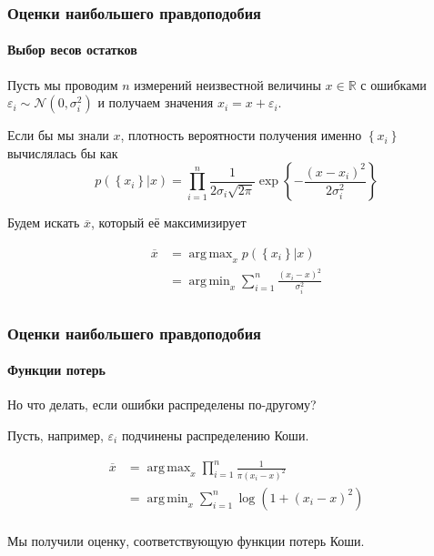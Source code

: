 \documentclass[notheorems,aspectratio=169]{beamer}
\DeclareMathOperator*{\argmax}{arg\,max}
\DeclareMathOperator*{\argmin}{arg\,min}
\begin{document}
\begin{frame}
  \frametitle{Оценки наибольшего правдоподобия}
  \framesubtitle{Выбор весов остатков}
  Пусть мы проводим $n$ измерений неизвестной величины $x\in\mathbb{R}$ с ошибками $\varepsilon_i\sim\mathcal{N}\left(0,\sigma_i^2\right)$ и получаем значения $x_i=x+\varepsilon_i$.
  
  Если бы мы знали $x$, плотность вероятности получения именно $\left\{x_i\right\}$ вычислялась бы как
  $$p\left(\left.\left\{x_i\right\}\right\rvert x\right)=\prod_{i=1}^n\frac{1}{2\sigma_i\sqrt{2\pi}}\exp\left\{-\frac{\left(x-x_i\right)^2}{2\sigma_i^2}\right\}$$

  Будем искать $\overline{x}$, который её максимизирует

  \begin{align*}
    \overline{x} & =\argmax_{x}p\left(\left.\left\{x_i\right\}\right\rvert x\right) \\
                 & =\argmin_{x}\sum_{i=1}^n\frac{\left(x_i-x\right)^2}{\sigma_i^2} \\
  \end{align*}
  
\end{frame}

\begin{frame}
  \frametitle{Оценки наибольшего правдоподобия}
  \framesubtitle{Функции потерь}
  Но что делать, если ошибки распределены по-другому?

  Пусть, например, $\varepsilon_i$ подчинены распределению Коши.

  \begin{align*}
    \overline{x} & =\argmax_{x}\prod_{i=1}^n\frac{1}{\pi \left(x_i-x\right)^2} \\
                 & =\argmin_{x}\sum_{i=1}^n \log\left(1+\left(x_i-x\right)^2\right) \\
  \end{align*}
  
  Мы получили оценку, соответствующую функции потерь Коши.
\end{frame}


\end{document}
